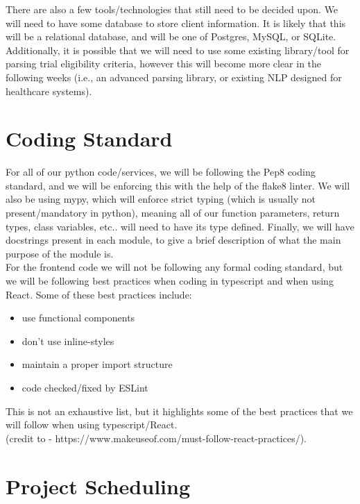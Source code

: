 \documentclass{article}
\begin{document}
There are also a few tools/technologies that still need to be decided upon. We will need to have some database to store
client information. It is likely that this will be a relational database, and will be one of Postgres, MySQL, or SQLite.
Additionally, it is possible that we will need to use some existing library/tool for parsing trial eligibility criteria, however this 
will become more clear in the following weeks (i.e., an advanced parsing library, or existing NLP designed for healthcare systems).

\section{Coding Standard}

For all of our python code/services, we will be following the Pep8 coding standard, and we will be enforcing this 
with the help of the flake8 linter. We will also be using mypy, which will enforce strict typing (which is usually not present/mandatory
in python), meaning all of our function parameters, return types, class variables, etc.. will need to have its type defined. Finally, we will
have docstrings present in each module, to give a brief description of what the main purpose of the module is.\\

For the frontend code we will not be following any formal coding standard, but we will be following best practices
when coding in typescript and when using React. Some of these best practices include:
\begin{itemize}
	\item use functional components
	\item don't use inline-styles
	\item maintain a proper import structure
	\item code checked/fixed by ESLint
\end{itemize}

This is not an exhaustive list, but it highlights some of the best practices that we will follow when using typescript/React.\\
(credit to - https://www.makeuseof.com/must-follow-react-practices/).


\section{Project Scheduling}
\end{document}
